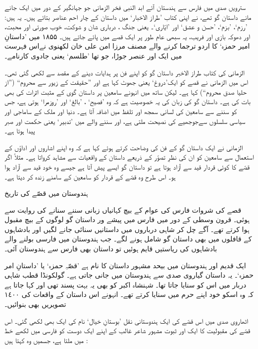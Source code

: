 \documentclass[a4paper]{article}
\newcommand{\subtitle}[1]{\begingroup\fontsize{24pt}{12pt}\titlefont #1\endgroup\nopagebreak}
\begin{document}
سترویں صدی میں فارس سے ہندستان آئے ابد النبی فخر الزمانی جو جہانگیر کے دور میں ایک جانے مانے داستان گو تھے، نے اپنی کتاب ’طراز الاخبار‘ میں داستان کے چار احم عناصر بتائے ہیں۔ یہ ہیں: ’رزم‘، ’بزم‘، ’حسن و عشق‘ اور ’ایّاری‘۔ یعنی جنگ ،  درباری شان و شوکت، خوب صورتی اور محبت، اور  دھوکہ بازی اور فریب، یہ سبھی عام طور پر ایک قصے میں پائے جاتے ہیں۔ ۱۸۵۵ میں ’داستانِ امیر حمزہ‘ کا اردو ترجما کرنے والے مصنف مرزا امن علی خان لکھنوی نےاس فہرست میں ایک اور عنصر جوڑا، جو تھا ’طلسم‘ یعنی جادوی کارنامے۔

الزمانی کی کتاب طراز الاخبر داستان گو کو اپنے فن پر ہدایات دینے کے مقصد سے لکھی گئی تھی۔ اس میں الزمانی نے قصے کو ایک’دروغ‘ یعنی جھوٹ کہا ہے اور ”حقیقت کے زیور سے محروم“ (”از حلیا صدق محروم“) کہا ہے۔  لیکن ساتھ میں انہونے سامعین پر داستان گوی  کے مثبت اثرات کی بھی بات کی ہے۔  داستان گو کی زبان کی یہ خصوصیت ہے کہ وہ ’فصیح‘ ، ’بالغ‘ اور ’روزمرا‘ ہوتی ہے، جس کو سننے سے سامعین کی لسانی سمجھ اور تلفظ میں اضافہ آتا ہے۔ دنیا اور ملک کے ساماجی اور سیاسی سلسلوں  سےجوجھیے کی نصیحت ملتی ہے، اور سننے والے میں ’تدبیر‘ یعنی حکمت اور صبر پیدا ہوتا ہے۔

الزمانی نے ایک داستان گو کے فن کی  وضاحت  کرتے ہوئے کہا ہے کہ وہ اپنے اشاروں اور اداؤں کے استعمال سے سامعین کو ان کی نظرِ تصوّر کے ذریعے داستان کے واقعیات سے مشاہد کرواتا ہے۔ مثلاً اگر قصّے کا کوئی قردار قید سے آزاد ہوتا ہے تو داستان گو ایسے پیش آتا ہے  جیسے وہ خود قید سے آزاد ہوا ہو۔ اس طرح وہ قصّے کے قردار  کو سامعین کے سامنے زندہ کر دیتا ہے۔ 

\subtitle{ہندوستان میں قصّے کی تاریخ}

قصے کی شروات فارس کی عوام کے بیچ کہانیاں زبانی سننے سنانے کی روایت سے ہوئی۔ قرون وسطی کے دور میں فارس میں پیشے ور داستان گو لوگوں کے بیچ مقبول ہوا کرتے تھے۔ آگے چل کر شاہی درباروں میں داستانیں سنائی جانے لگیں اور بادشاہوں کے قافلوں میں بھی داستان گو شامل ہونے لگے۔ جب ہندوستان میں فارسی بولنے والے بادشاہوں کی ریاستیں قایم ہوئیں تو داستان بھی فارس سے ہندوستان آئی۔

ایک قدیم اور ہندوستان میں بیحد مشہور داستان کا نام ہے ’قصّہِ حمزہ‘ یا ’داستانِ امر حمزہ‘۔ یہ داستان گیاروی صدی سے ہندوستان میں جانی جاتی ہے۔ گولکونڈا قطب شاہی دربار میں اس کو سنایا جاتا تھا۔ شہنشاہ اکبر کو بھی یہ بہت پسند تھی اور کہا جاتا ہے کہ وہ اسکو خود اپنے حرم میں سنایا کرتے تھے۔ انہونے اس داستان کے واقعات کی ١٤٠٠ تصویریں بھی بنوائیں۔

 اٹھاروی صدی میں اس قصّے کی ایک ہندوستانی نقل ’بوستانِ خیال‘ نام کی ایک بھی لکھی گئی۔ اس قصّے کی مقبولیت کا ایک اور ثبوت مشہور شاعر غالب کے اپنے ایک دوست کو فارسی میں لکھے خط میں ملتا ہے، جسمیں وہ کہتا ہیں :
\end{document}
